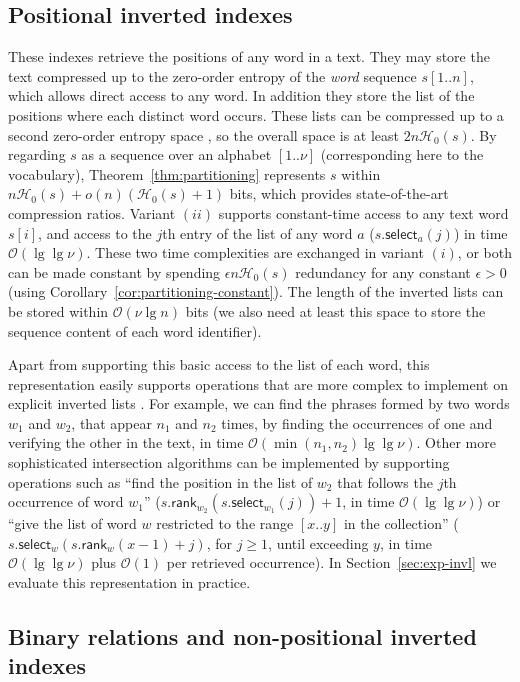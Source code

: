 \documentclass[11pt]{article}
\newcommand{\Oh}[1]
    {\ensuremath{\mathcal{O}\left( {#1} \right)}}
\newcommand{\rank}
    {\ensuremath{\mathsf{rank}}}
\newcommand{\select}
    {\ensuremath{\mathsf{select}}}
\newcommand{\HH}{\mathcal{H}}
\newcommand{\Ho}{\HH_0}
\begin{document}
\subsection{Positional inverted indexes}

These indexes retrieve the positions of any word in a text. They
may store the text compressed up to the zero-order
entropy of the {\em word} sequence $s[1..n]$, which allows direct access to
any word. In addition they store the list of the positions where each distinct
word occurs. These lists can be compressed up to a second zero-order entropy
space \cite{NM07}, so the overall space is at least $2n\Ho(s)$. By regarding
$s$ as a sequence over an alphabet $[1..\nu]$ (corresponding here to the
vocabulary), Theorem~\ref{thm:partitioning} represents $s$ within 
$n\Ho(s) + o(n)(\Ho(s)+1)$ bits, which provides state-of-the-art
compression ratios. Variant $(ii)$ supports 
constant-time access to any text word $s[i]$, and access to the $j$th 
entry of the list of any word $a$ ($s.\select_a(j)$) in time $\Oh{\lg\lg\nu}$. 
These two time complexities are exchanged in variant $(i)$, or both can be 
made constant by spending $\epsilon n\Ho(s)$ redundancy for any constant 
$\epsilon>0$ (using Corollary~\ref{cor:partitioning-constant}). 
The length of the inverted lists can be stored within 
$\Oh{\nu\lg n}$ bits (we also need at least this space to store the sequence 
content of each word identifier).

Apart from supporting this basic access to the list of each word, this
representation easily supports operations that are more complex to implement
on explicit
inverted lists \cite{BLOLS09}. For example, we can find the phrases formed
by two words $w_1$ and $w_2$, that appear $n_1$ and $n_2$ times, by finding the 
occurrences of one and verifying the other in the text, in time 
$\Oh{\min(n_1,n_2)\lg\lg\nu}$. Other more sophisticated intersection algorithms
\cite{BLOLS09} can be implemented by supporting operations such as ``find the
position in the list of $w_2$ that follows the $j$th occurrence of word $w_1$''
($s.\rank_{w_2}(s.\select_{w_1}(j))+1$, in time $\Oh{\lg\lg\nu}$) or ``give
the list of word $w$ restricted to the range $[x..y]$ in the collection''
($s.\select_w(s.\rank_w(x-1)+j)$, for $j \ge 1$, until exceeding $y$, in time
$\Oh{\lg\lg\nu}$ plus $\Oh{1}$ per retrieved occurrence).
In Section~\ref{sec:exp-invl} we evaluate this representation in practice.

\subsection{Binary relations and non-positional inverted indexes}
\label{sec:binrels}
\end{document}
